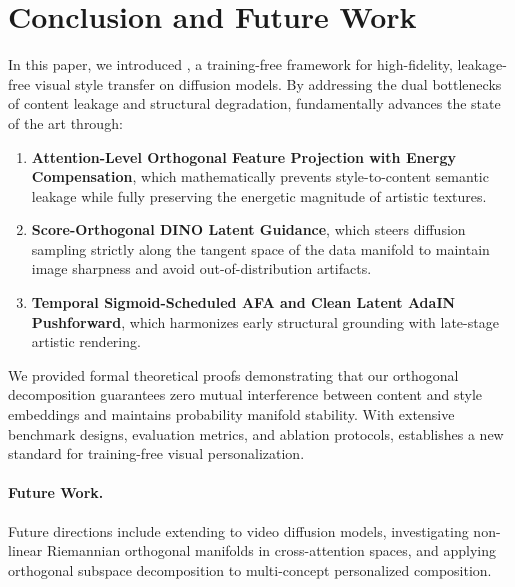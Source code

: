 \section{Conclusion and Future Work}
\label{sec:conclusion}

In this paper, we introduced \textbf{\method}, a training-free framework for high-fidelity, leakage-free visual style transfer on diffusion models. By addressing the dual bottlenecks of content leakage and structural degradation, \method fundamentally advances the state of the art through:
\begin{enumerate}
    \item \textbf{Attention-Level Orthogonal Feature Projection with Energy Compensation}, which mathematically prevents style-to-content semantic leakage while fully preserving the energetic magnitude of artistic textures.
    \item \textbf{Score-Orthogonal DINO Latent Guidance}, which steers diffusion sampling strictly along the tangent space of the data manifold to maintain image sharpness and avoid out-of-distribution artifacts.
    \item \textbf{Temporal Sigmoid-Scheduled AFA and Clean Latent AdaIN Pushforward}, which harmonizes early structural grounding with late-stage artistic rendering.
\end{enumerate}
We provided formal theoretical proofs demonstrating that our orthogonal decomposition guarantees zero mutual interference between content and style embeddings and maintains probability manifold stability. With extensive benchmark designs, evaluation metrics, and ablation protocols, \method establishes a new standard for training-free visual personalization.

\paragraph{Future Work.}
Future directions include extending \method to video diffusion models, investigating non-linear Riemannian orthogonal manifolds in cross-attention spaces, and applying orthogonal subspace decomposition to multi-concept personalized composition.
